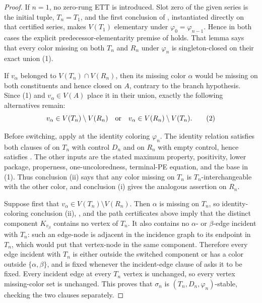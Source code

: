\begin{proof}
If $n=1$, no zero-rung ETT is introduced.  Slot zero of the given series is
the initial tuple, $T_n=T_1$, and the first conclusion of
, instantiated directly on that certified
series, makes $V(T_1)$ elementary under $\varphi_0=\varphi_{n-1}$.  Hence in
both cases the explicit predecessor-elementarity premise of
 holds.  That lemma says that every
color missing on both $T_n$ and $R_n$ under $\varphi_n$ is singleton-closed
on their exact union (1).

If $v_\alpha$ belonged to $V(T_n)\cap V(R_n)$, then its missing color
$\alpha$ would be missing on both constituents and hence closed on $A$,
contrary to the branch hypothesis.  Since (1) and $v_\alpha\in V(A)$ place
it in their union, exactly the following alternatives remain:
\[
 v_\alpha\in V(T_n)\setminus V(R_n)
 \quad\hbox{or}\quad
 v_\alpha\in V(R_n)\setminus V(T_n).                           \tag{2}
\]

Before switching, apply  at the identity coloring
$\varphi_n$.  The identity relation satisfies both clauses of
 on $T_n$ with control $D_n$ and on $R_n$ with
empty control, hence satisfies .  The other
inputs are the stated maximum property, positivity, lower package,
properness, one-uncoloredness, terminal-PE equation, and the base in (1).
Thus conclusion (ii) says that any color missing on $T_n$ is
$T_n$-interchangeable with the other color, and conclusion (i) gives the
analogous assertion on $R_n$.

Suppose first that $v_\alpha\in V(T_n)\setminus V(R_n)$.  Then $\alpha$ is
missing on $T_n$, so identity-coloring conclusion (ii),
, and the path certificates above imply that
the distinct component $K_{v_\beta}$ contains no vertex of $T_n$.  It also
contains no $\alpha$- or $\beta$-edge incident with $T_n$: such an edge-node
is adjacent in the incidence graph to its endpoint in $T_n$, which would
put that vertex-node in the same component.  Therefore every edge incident
with $T_n$ is either outside the switched component or has a color outside
$\{\alpha,\beta\}$, and is fixed whenever the incident-edge clause of
 asks it to be fixed.  Every incident edge at every
$T_n$ vertex is unchanged, so every vertex missing-color set is unchanged.
This proves that $\sigma_n$ is $(T_n,D_n,\varphi_n)$-stable, checking the
two clauses separately.


\end{proof}
